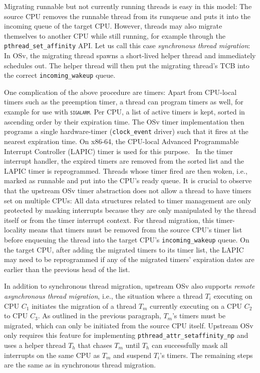 \documentclass[12pt,a4paper]{book}
\begin{document}
Migrating runnable but not currently running threads is easy in this model:
The source CPU removes the runnable thread from its runqueue and puts it into the incoming queue of the target CPU.
However, threads may also migrate themselves to another CPU while still running, for example through the \lstinline[style=figurecpp]{pthread_set_affinity} API.
Let us call this case \emph{synchronous thread migration}:
In OSv, the migrating thread spawns a short-lived helper thread and immediately schedules out.
The helper thread will then put the migrating thread's TCB into the correct \lstinline[style=figurecpp]{incoming_wakeup} queue.~\cite{osvGit}

One complication of the above procedure are timers:
Apart from CPU-local timers such as the preemption timer, a thread can program timers as well, for example for use with \textsc{\texttt{sigalarm}}.
Per CPU, a list of active timers is kept, sorted in ascending order by their expiration time.
The OSv timer implementation then programs a single hardware-timer (\lstinline[style=figurecpp]{clock_event} driver) such that it fires at the nearest expiration time.
On x86-64, the CPU-local Advanced Programmable Interrupt Controller (LAPIC) timer is used for this purpose.~\cite{intelSDMLAPICTimer}
In the timer interrupt handler, the expired timers are removed from the sorted list and the LAPIC timer is reprogrammed.
Threads whose timer fired are then woken, i.e., marked as runnable and put into the CPU's ready queue.
It is crucial to observe that the upstream OSv timer abstraction does not allow a thread to have timers set on multiple CPUs:
All data structures related to timer management are only protected by masking interrupts because they are only manipulated by the thread itself or from the timer interrupt context.
For thread migration, this timer-locality means that timers must be removed from the source CPU's timer list before enqueuing the thread into the target CPU's \lstinline[style=figurecpp]{incoming_wakeup} queue.
On the target CPU, after adding the migrated timers to its timer list, the LAPIC may need to be reprogrammed if any of the migrated timers' expiration dates are earlier than the previous head of the list.~\cite{osvGit}

In addition to synchronous thread migration, upstream OSv also supports \emph{remote asynchronous thread migration}, i.e., the situation where a thread $T_i$ executing on CPU $C_1$ initiates the migration of a thread $T_m$ currently executing on a CPU $C_2$ to CPU $C_3$.
As outlined in the previous paragraph, $T_m$'s timers must be migrated, which can only be initiated from the source CPU itself.
Upstream OSv only requires this feature for implementing \lstinline[style=figurecpp]{pthread_attr_setaffinity_np} and uses a helper thread $T_h$ that chases $T_m$ until $T_h$ can successfully mask all interrupts on the same CPU as $T_m$ and suspend $T_i$'s timers.
The remaining steps are the same as in synchronous thread migration.~\cite{osvGit}
\end{document}
